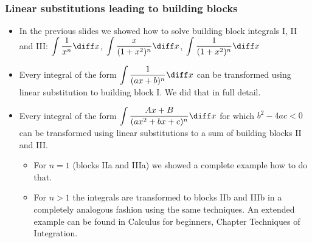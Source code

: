 \begin{frame}
\frametitle{Linear substitutions leading to building blocks}
\begin{itemize}
\item In the previous slides we showed how to solve building block integrals I, II and III:
$\displaystyle \int \frac{1}{x^n }\diff x$, $\displaystyle \int \frac{x}{(1+x^2)^n }\diff x$, $\displaystyle \int \frac{1}{(1+x^2)^n }\diff x$
\item<2-> Every integral of the form
$\displaystyle \int \frac{1}{(ax+b)^n }\diff x$
can be transformed using linear substitution to building block I. We did that in full detail.
\item<3-> Every integral of the form  
$\displaystyle \int \frac{Ax+B}{(ax^2+bx+c)^{n} }\diff x$
for which $b^2-4ac<0$ can be transformed using linear substitutions to a sum of building blocks II and III. 
\begin{itemize}
\item<4-> For $n=1$ (blocks IIa and IIIa) we showed a complete example how to do that. 
\item<5-> For $n>1$ the integrals are transformed to blocks IIb and IIIb in a completely analogous fashion using the same techniques. An extended example can be found in Calculus for beginners, Chapter Techniques of Integration.
\end{itemize}
\end{itemize}

\end{frame}